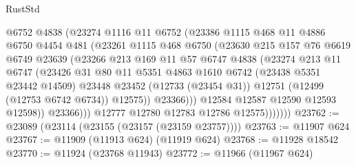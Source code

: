 \begin{lexlean}{RustStd}
\begin{coremodule}
                        @6752
                        @4838
                        (@23274
                          @1116
                          @11
                          @6752
                          (@23386
                            @1115
                            @468
                            @11
                            @4886
                            @6750
                            @4454
                            @481
                            (@23261
                              @1115
                              @468
                              @6750
                              (@23630
                                @215
                                @157
                                @76
                                @6619
                                @6749
                                @23639
                                (@23266
                                  @213
                                  @169
                                  @11
                                  @57
                                  @6747
                                  @4838
                                  (@23274
                                    @213
                                    @11
                                    @6747
                                    (@23426
                                      @31
                                      @80
                                      @11
                                      @5351
                                      @4863
                                      @1610
                                      @6742
                                      (@23438 @5351 @23442 @14509)
                                      @23448
                                      @23452
                                      (@12733 (@23454 @31))
                                      @12751
                                      (@12499 (@12753 @6742 @6734))
                                      @12575))
                                  @23366)))
                            @12584
                            @12587
                            @12590
                            @12593
                            @12598))
                        @23366)))
                  @12777
                  @12780
                  @12783
                  @12786
                  @12575)))))))
@23762 := @23089 (@23114 (@23155 (@23157 (@23159 @23757))))
@23763 := @11907 @624
@23767 := @11909 (@11913 @624) (@11919 @624)
@23768 := @11928 @18542
@23770 := @11924 (@23768 @11943)
@23772 := @11966 (@11967 @624)

\end{coremodule}
\end{lexlean}
